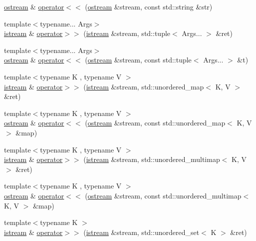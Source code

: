 \begin{DoxyCompactItemize}
\hyperlink{classmui_1_1ostream}{ostream} \& \hyperlink{namespacemui_aef4e1b70b6245ef114b5ebeee77e0d05}{operator$<$$<$} (\hyperlink{classmui_1_1ostream}{ostream} \&stream, const std\+::string \&str)
\item 
{\footnotesize template$<$typename... Args$>$ }\\\hyperlink{classmui_1_1istream}{istream} \& \hyperlink{namespacemui_ad781b9969378810aa4b2837f96e72631}{operator$>$$>$} (\hyperlink{classmui_1_1istream}{istream} \&stream, std\+::tuple$<$ Args... $>$ \&ret)
\item 
{\footnotesize template$<$typename... Args$>$ }\\\hyperlink{classmui_1_1ostream}{ostream} \& \hyperlink{namespacemui_ac718570df36d184bd1a15a61eade424e}{operator$<$$<$} (\hyperlink{classmui_1_1ostream}{ostream} \&stream, const std\+::tuple$<$ Args... $>$ \&t)
\item 
{\footnotesize template$<$typename K , typename V $>$ }\\\hyperlink{classmui_1_1istream}{istream} \& \hyperlink{namespacemui_a76360653d74f0b73ebc129f988f8f0d2}{operator$>$$>$} (\hyperlink{classmui_1_1istream}{istream} \&stream, std\+::unordered\+\_\+map$<$ K, V $>$ \&ret)
\item 
{\footnotesize template$<$typename K , typename V $>$ }\\\hyperlink{classmui_1_1ostream}{ostream} \& \hyperlink{namespacemui_aae82cad4a3539e32a59b1fa178a374d4}{operator$<$$<$} (\hyperlink{classmui_1_1ostream}{ostream} \&stream, const std\+::unordered\+\_\+map$<$ K, V $>$ \&map)
\item 
{\footnotesize template$<$typename K , typename V $>$ }\\\hyperlink{classmui_1_1istream}{istream} \& \hyperlink{namespacemui_ac8e839af83c9b533659a10af207a0da7}{operator$>$$>$} (\hyperlink{classmui_1_1istream}{istream} \&stream, std\+::unordered\+\_\+multimap$<$ K, V $>$ \&ret)
\item 
{\footnotesize template$<$typename K , typename V $>$ }\\\hyperlink{classmui_1_1ostream}{ostream} \& \hyperlink{namespacemui_a79f363b28a0f784719203d0c5be85201}{operator$<$$<$} (\hyperlink{classmui_1_1ostream}{ostream} \&stream, const std\+::unordered\+\_\+multimap$<$ K, V $>$ \&map)
\item 
{\footnotesize template$<$typename K $>$ }\\\hyperlink{classmui_1_1istream}{istream} \& \hyperlink{namespacemui_a17c76f489d40340e045de4a883cde952}{operator$>$$>$} (\hyperlink{classmui_1_1istream}{istream} \&stream, std\+::unordered\+\_\+set$<$ K $>$ \&ret)

\end{DoxyCompactItemize}
